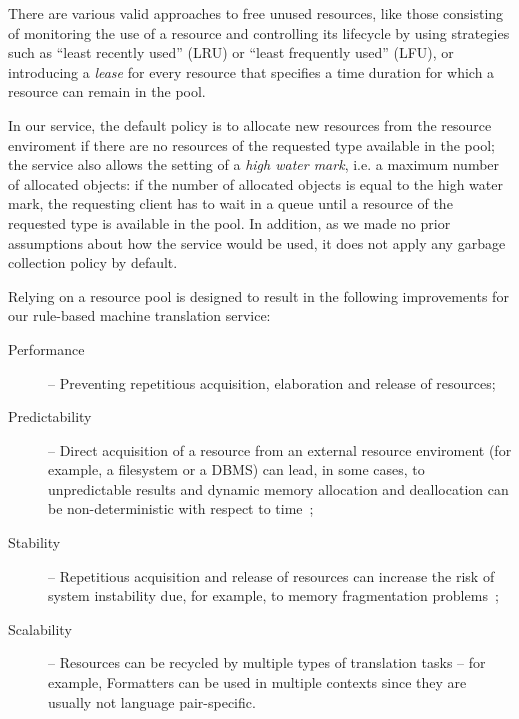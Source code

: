\documentclass[11pt]{article}
\begin{document}
There are various valid approaches to free unused resources, like those consisting of monitoring the use of a resource and controlling its lifecycle by using  strategies such as ``least recently used'' (LRU) or ``least frequently used'' (LFU), or introducing a \emph{lease} for every resource that specifies a time duration for which a resource can remain in the pool.

In our service, the default policy is to allocate new resources from the resource enviroment if there are no resources of the requested type available in the pool; the service also allows the setting of a \emph{high water mark}, i.e. a maximum number of allocated objects: if the number of allocated objects is equal to the high water mark, the requesting client has to wait in a queue until a resource of the requested type is available in the pool. In addition, as we made no prior assumptions about how the service would be used, it does not apply any garbage collection policy by default.

Relying on a resource pool is designed to result in the following improvements for our rule-based machine translation service:

\begin{description}
 \item[Performance] -- Preventing repetitious acquisition, elaboration and release of resources;
 \item[Predictability] -- Direct acquisition of a resource from an external resource enviroment (for example, a filesystem or a DBMS) can lead, in some cases, to unpredictable results and dynamic memory allocation and deallocation can be non-deterministic with respect to time~\citep{realtime};
 \item[Stability] -- Repetitious acquisition and release of resources can increase the risk of system instability due, for example, to memory fragmentation problems~\citep{robust, realtime};  %



 \item[Scalability] -- Resources can be recycled by multiple types of translation tasks -- for example, Formatters can be used in multiple contexts since they are usually not language pair-specific.
\end{description}
\end{document}
